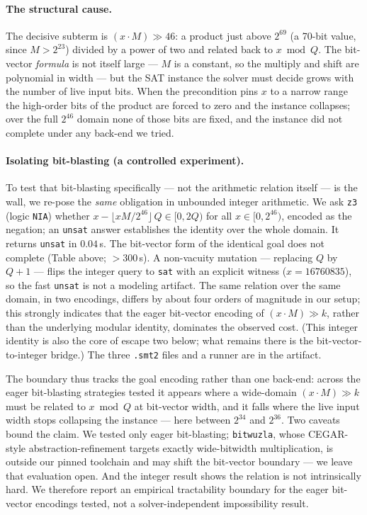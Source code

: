 \documentclass[journal=tches,submission,review]{iacrtrans}
\newcommand{\code}[1]{\texttt{#1}}
\begin{document}
\paragraph{The structural cause.} The decisive subterm is $(x \cdot M) \gg 46$: a product just above
$2^{69}$ (a 70-bit value, since $M > 2^{23}$) divided by a power of two and related back to $x \bmod Q$.
The bit-vector \emph{formula} is not
itself large --- $M$ is a constant, so the multiply and shift are polynomial in width --- but the SAT
instance the solver must decide grows with the number of live input bits. When the precondition pins $x$
to a narrow range the high-order bits of the product are forced to zero and the instance collapses; over
the full $2^{46}$ domain none of those bits are fixed, and the instance did not complete under any
back-end we tried.

\paragraph{Isolating bit-blasting (a controlled experiment).} To test that bit-blasting specifically ---
not the arithmetic relation itself --- is the wall, we re-pose the \emph{same} obligation in unbounded
integer arithmetic. We ask \code{z3} (logic \code{NIA}) whether
$x - \lfloor x M / 2^{46} \rfloor\,Q \in [0, 2Q)$ for all $x \in [0, 2^{46})$, encoded as the negation; an
\code{unsat} answer establishes the identity over the whole domain. It returns \code{unsat} in
$0.04$\,s. The bit-vector form of the identical goal does not complete (Table above; $>300$\,s). A
non-vacuity mutation --- replacing $Q$ by $Q+1$ --- flips the integer query to \code{sat} with an explicit
witness ($x = 16760835$), so the fast \code{unsat} is not a modeling artifact. The same relation over the
same domain, in two encodings, differs by about four orders of magnitude in our setup; this strongly
indicates that the eager bit-vector encoding of $(x \cdot M) \gg k$, rather than the underlying modular
identity, dominates the observed cost. (This integer identity is also the core of escape two below; what remains there
is the bit-vector-to-integer bridge.) The three \code{.smt2} files and a runner are in the artifact.

The boundary thus tracks the goal encoding rather than one back-end: across the eager bit-blasting
strategies tested it appears where a wide-domain $(x \cdot M) \gg k$ must be related to $x \bmod Q$ at
bit-vector width, and it falls where the live input width stops collapsing the instance --- here between
$2^{34}$ and $2^{36}$. Two caveats bound the claim. We tested only eager bit-blasting; \code{bitwuzla},
whose CEGAR-style abstraction-refinement targets exactly wide-bitwidth multiplication, is outside our
pinned toolchain and may shift the bit-vector boundary --- we leave that evaluation open. And the integer
result shows the relation is not intrinsically hard. We therefore report an empirical tractability
boundary for the eager bit-vector encodings tested, not a solver-independent impossibility result.
\end{document}
